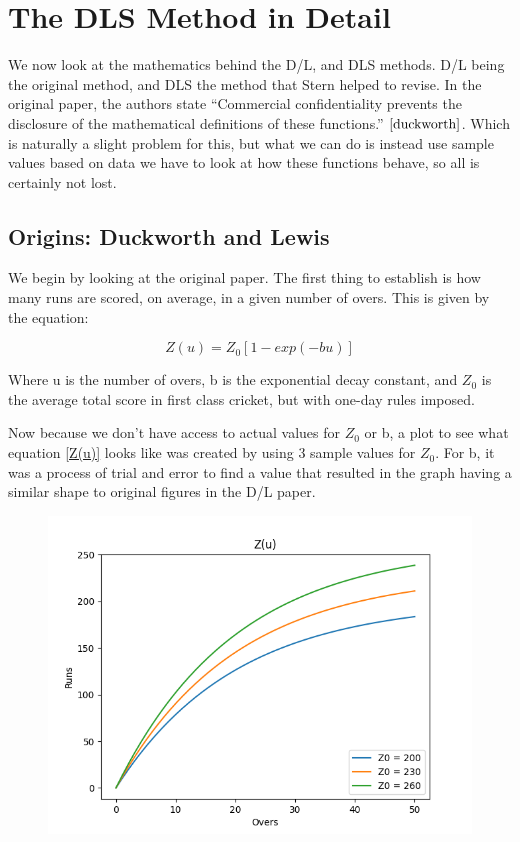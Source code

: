 \chapter{The DLS Method in Detail}

We now look at the mathematics behind the D/L, and DLS methods. D/L being the original
method, and DLS the method that Stern helped to revise. In the original paper, the authors
state ``Commercial confidentiality prevents the disclosure of the mathematical definitions
of these functions.'' $\cite{duckworth}$. Which is naturally a slight problem for this, but what
we can do is instead use sample values based on data we have to look at how these functions behave,
so all is certainly not lost.

\section{Origins: Duckworth and Lewis}
We begin by looking at the original paper. The first thing to establish is how many runs are scored,
on average, in a given number of overs. This is given by the equation:

\begin{equation}
    Z(u) = Z_0[1-exp(-bu)]
    \label{Z(u)}  
\end{equation}

Where u is the number of overs, b is the exponential decay constant, and $Z_0$ is the
average total score in first class cricket, but with one-day rules imposed.  

Now because we don't have access to actual values for $Z_0$ or b, a plot to see what equation \ref{Z(u)} looks 
like was created by using 3 sample values for $Z_0$. For b, it was a process of trial and error to find a value
that resulted in the graph having a similar shape to original figures in the D/L paper. 

\begin{figure}[h]
    \centering
    \includegraphics[scale=0.6]{figures/z(u).png}
    \label{Z(u)_graph}
\end{figure}

